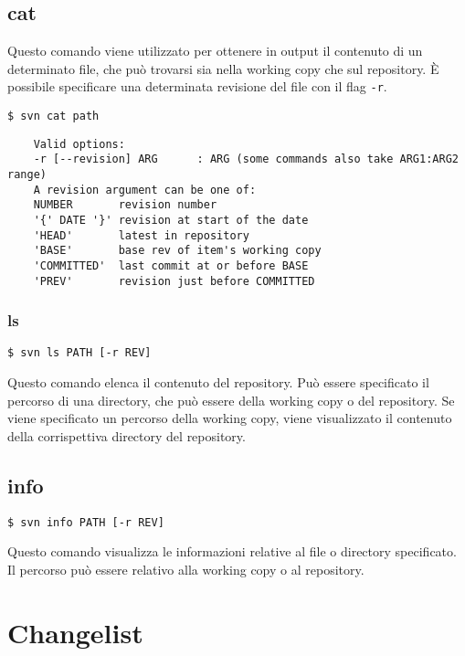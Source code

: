 \subsection{cat}

Questo comando viene utilizzato per ottenere in output il contenuto di un determinato file, che può trovarsi sia nella working copy che sul repository. \`E possibile specificare una determinata revisione del file con il flag \texttt{-r}.

\begin{lstlisting}
$ svn cat path
\end{lstlisting}

\begin{verbatim}
	Valid options:
	-r [--revision] ARG      : ARG (some commands also take ARG1:ARG2 range)
	A revision argument can be one of:
	NUMBER       revision number
	'{' DATE '}' revision at start of the date
	'HEAD'       latest in repository
	'BASE'       base rev of item's working copy
	'COMMITTED'  last commit at or before BASE
	'PREV'       revision just before COMMITTED
\end{verbatim}

\subsubsection{ls}

\begin{lstlisting}
$ svn ls PATH [-r REV]
\end{lstlisting}

Questo comando elenca il contenuto del repository. Può essere specificato il percorso di una directory, che può essere della working copy o del repository. Se viene specificato un percorso della working copy, viene visualizzato il contenuto della corrispettiva directory del repository.

\subsection{info}

\begin{lstlisting}
$ svn info PATH [-r REV]
\end{lstlisting}

Questo comando visualizza le informazioni relative al file o directory specificato. Il percorso può essere relativo alla working copy o al repository.

\section{Changelist}

